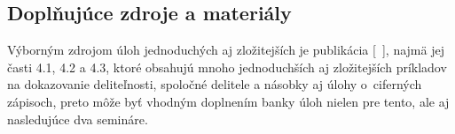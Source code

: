 \subsection*{Doplňujúce zdroje a materiály}
Výborným zdrojom úloh jednoduchých aj zložitejších je publikácia [~\cite{holton2010}], najmä jej časti 4.1, 4.2 a 4.3, ktoré obsahujú mnoho jednoduchších aj zložitejších príkladov na dokazovanie deliteľnosti, spoločné delitele a násobky aj úlohy o~ciferných zápisoch, preto môže byť vhodným doplnením banky úloh nielen pre tento, ale aj nasledujúce dva semináre.

